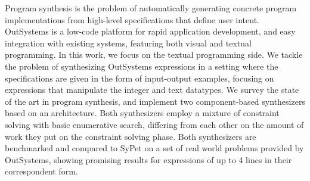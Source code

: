 Program synthesis is the problem of automatically generating concrete program
implementations from high-level specifications that define user intent.
OutSystems is a low-code platform for rapid application development,
and easy integration with existing systems, featuring both visual and
textual programming.
In this work, we focus on the textual programming side.
We tackle the problem of synthesizing OutSystems expressions in a setting where
the specifications are given in the form of input-output examples, focusing on
expressions that manipulate the integer and text datatypes.
We survey the state of the art in program synthesis, and implement two
component-based synthesizers based on an  architecture.
Both synthesizers employ a mixture of constraint solving with basic enumerative
search, differing from each other on the amount of work they put on the
constraint solving phase.
Both synthesizers are benchmarked and compared to SyPet on a set of real world
problems provided by OutSystems, showing promising results for expressions of up
to 4 lines in their correspondent  form.